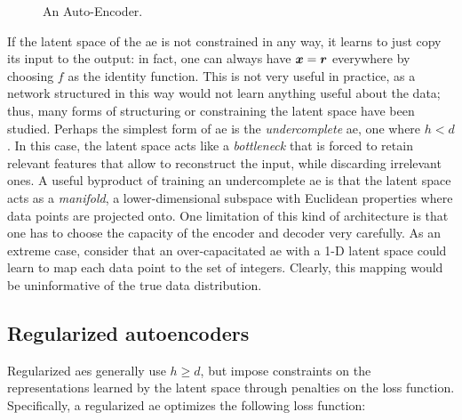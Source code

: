 \begin{figure*}[h!]
    \centering
    \resizebox{.45\textwidth}{!}{}
    \caption{An Auto-Encoder.}
    \label{fig:autoencoder}
\end{figure*}
If the latent space of the \gls{ae} is not constrained in any way, it learns to just copy its input to the output: in fact, one can always have $\Vector{x} = \Vector{r}$ everywhere by choosing $f$ as the identity function. This is not very useful in practice, as a network structured in this way would not learn anything useful about the data; thus, many forms of structuring or constraining the latent space have been studied. Perhaps the simplest form of \gls{ae} is the \emph{undercomplete} \gls{ae}, \ie one where $h < d$. In this case, the latent space acts like a \emph{bottleneck} that is forced to retain relevant features that allow to reconstruct the input, while discarding irrelevant ones. A useful byproduct of training an undercomplete \gls{ae} is that the latent space acts as a \emph{manifold}, \ie a lower-dimensional subspace with Euclidean properties where data points are projected onto. One limitation of this kind of architecture is that one has to choose the capacity of the encoder and decoder very carefully. As an extreme case, consider that an over-capacitated \gls{ae} with a 1-D latent space could learn to map each data point to the set of integers. Clearly, this mapping would be uninformative of the true data distribution.

\subsection{Regularized autoencoders}
Regularized \glspl{ae} generally use $h \geq d$, but impose constraints on the representations learned by the latent space through penalties on the loss function. Specifically, a regularized \gls{ae} optimizes the following loss function:

